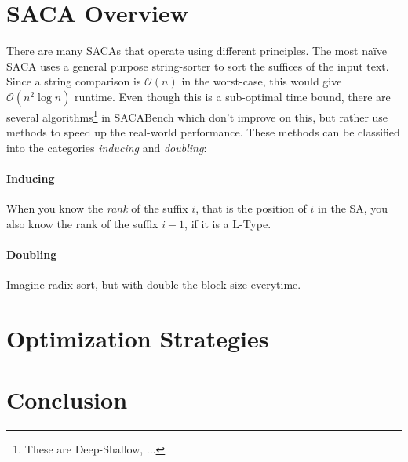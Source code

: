 \section{SACA Overview}

There are many SACAs that operate using different principles.
The most na\"ive SACA uses a general purpose string-sorter to sort the suffices of the input text.
Since a string comparison is $\mathcal O (n)$ in the worst-case, this would give $\mathcal O (n^2 \log n)$ runtime.
Even though this is a sub-optimal time bound,
there are several algorithms\footnote{These are Deep-Shallow, ...} in SACABench which don't improve on this,
but rather use methods to speed up the real-world performance.
These methods can be classified into the categories \emph{inducing} and \emph{doubling}:
%
\paragraph{Inducing} When you know the \emph{rank} of the suffix $i$, that is the position of $i$ in the SA, you also know the rank of the suffix $i-1$, if it is a L-Type.
\paragraph{Doubling} Imagine radix-sort, but with double the block size everytime. 

\bigskip

\blindtext

\section{Optimization Strategies}

\blindtext

\section{Conclusion}

\blindtext

\blindtext

